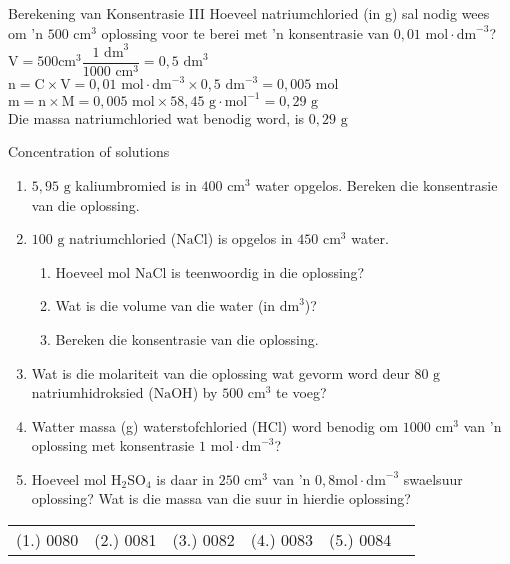       \begin{wex}{Berekening van Konsentrasie III }
{
\label{m38712*id283476}Hoeveel natriumchloried (in g) sal nodig wees om 'n $500 {\text{ cm}}^{3}$ oplossing voor te berei met 'n konsentrasie van $0,01 \text{ mol} \cdot \text{dm}^{-3}$?
   }
{
$\text{V}= 500 \text{cm}^{3} \dfrac{1 \text{ dm}^{3}}{1 000 \text{ cm}^{3}}=0,5 {\text{ dm}}^{3}$
$\text{n}=\text{C} \times \text{V}= 0,01 \text{ mol} \cdot \text{dm}^{-3} \times 0,5 \text{ dm}^{-3} = 0,005 \text{ mol}$
$\text{m}=\text{n} \times \text{M}= 0,005 \text{ mol} \times 58,45 \text{ g} \cdot \text{mol}^{-1} = 0,29 \text{ g}$\\
Die massa natriumchloried wat benodig word, is $0,29 \text{ g}$ 
}
    \end{wex}
    \noindent
\label{m38712*secfhsst!!!underscore!!!id1879}
            \begin{exercises}{ Concentration of solutions
      }
            \nopagebreak \noindent
      \label{m38712*id283713}\begin{enumerate}[noitemsep, label=\textbf{\arabic*}. ] 
\item $5,95 \text{ g}$ kaliumbromied is in $400 {\text{ cm}}^{3}$ water opgelos. Bereken die konsentrasie van die oplossing.
\item $100 \text{ g}$ natriumchloried ($\text{NaCl}$) is opgelos in $450 {\text{ cm}}^{3}$ water.
  \begin{enumerate}[noitemsep, label=\textbf{\alph*}. ] 
    \item Hoeveel mol NaCl is teenwoordig in die oplossing?
    \item Wat is die volume van die water (in ${\text{dm}}^{3}$)?
    \item Bereken die konsentrasie van die oplossing.
\end{enumerate}
\item Wat is die molariteit van die oplossing wat gevorm word deur $80 \text{ g}$ natriumhidroksied ($\text{NaOH}$) by $500 {\text{ cm}}^{3}$ te voeg? 
\item Watter massa (g) waterstofchloried ($\text{HCl}$) word benodig om $1000 {\text{ cm}}^{3}$ van 'n oplossing met konsentrasie $1 \text{ mol} \cdot {\text{dm}}^{-3}$?
\item Hoeveel mol $\text{H}{}_{2}\text{SO}{}_{4}$ is daar in $250 {\text{ cm}}^{3}$ van 'n $0,8 \text{mol} \cdot \text{dm}^{-3}$ swaelsuur oplossing? Wat is die massa van die suur in hierdie oplossing?
\end{enumerate}
\practiceinfo
\par 
 \par \begin{tabular}[h]{cccccc}
 (1.) 0080  &  (2.) 0081  &  (3.) 0082  &  (4.) 0083  &  (5.) 0084  & \end{tabular}
\end{exercises}
